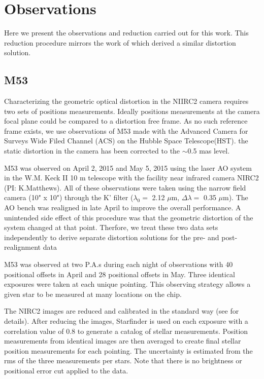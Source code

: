 \section{Observations}
Here we present the observations and reduction carried out for this work.  This reduction procedure mirrors the work of \cite{Yelda_2010} which derived a similar distortion solution.  
\subsection{M53}
Characterizing the geometric optical distortion in the NIIRC2 camera requires two sets of positions measurements.  Ideally positions measurements at the camera focal plane could be compared to a distortion free frame.  As no such reference frame exists, we use observations of M53 made with the Advanced Camera for Surveys Wide Filed Channel (ACS) on the Hubble Space Telescope(HST).  the static distortion in the camera has been corrected to the $\sim$0.5 mas level.

M53 was observed on April 2, 2015 and May 5, 2015 using the laser AO system in the W.M. Keck II 10 m telescope with the facility near infrared camera NIRC2 (PI: K.Matthews).  All of these observations were taken using the narrow field camera (10" x 10") through the K' filter ($\lambda_{0} = $ 2.12 $\mu$m, $\Delta\lambda =$ 0.35 $\mu$m).  The AO bench was realigned  in late April to improve the overall performance.  A unintended side effect of this procedure was that the geometric distortion of the system changed at that point.  Therfore, we treat these two data sets independently to derive separate distortion solutions for the pre- and post- realignment data 

M53 was observed at two P.A.s during each night of observations with 40 positional offsets in April and 28 positional offsets in May.  Three identical exposures were taken at each unique pointing.  This observing strategy allows a given star to be measured at many locations on the chip.

The NIRC2 images are reduced and calibrated in the standard way (see \cite{Yelda_2010} for details).  After reducing the images, Starfinder \citep{Diloatti} is used on each exposure with a correlation value of 0.8 to generate a catalog of stellar measurements.  Position measurements from identical images are then averaged to create final stellar position measurements for each pointing.  The uncertainty is estimated from the rms of the three measurements per stars.  Note that there is no brightness or positional error cut applied to the data.





